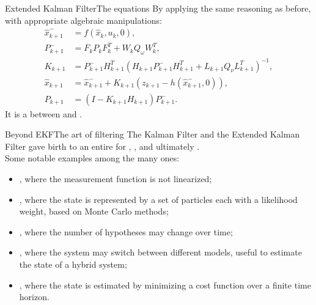 \begin{frame}{Extended Kalman Filter}{The equations}
  By applying the same reasoning as before, with appropriate algebraic manipulations:
  \begin{subequations}
    \begin{align}
      \hat{x}_{k+1}^{-} &= f(\hat{x}_k,u_k,0),\\
      P_{k+1}^{-} &= F_kP_kF_k^T + W_kQ_{\omega}W_k^T,\\
      K_{k+1} &= P_{k+1}^{-}H_{k+1}^T(H_{k+1}P_{k+1}^{-}H_{k+1}^T + L_{k+1}Q_{\nu}L_{k+1}^T)^{-1},\\
      \hat{x}_{k+1} &= \hat{x}_{k+1}^{-} + K_{k+1}(z_{k+1} - h(\hat{x}_{k+1}^{-},0)),\\
      P_{k+1} &= (I - K_{k+1}H_{k+1})P_{k+1}^{-}.
    \end{align}
  \end{subequations}
  It is a  between  and .
\end{frame}

\begin{frame}{Beyond EKF}{The art of filtering}
  The Kalman Filter and the Extended Kalman Filter gave birth to an entire  for , , and ultimately .\\
  Some notable examples among the many ones:
  \begin{itemize}
    \item<1-> , where the measurement function is not linearized;
    \item<2-> , where the state is represented by a set of particles each with a likelihood weight, based on Monte Carlo methods;
    \item<3-> , where the number of hypotheses may change over time;
    \item<4-> , where the system may switch between different models, useful to estimate the state of a hybrid system;
    \item<5-> , where the state is estimated by minimizing a cost function over a finite time horizon.
  \end{itemize}
\end{frame}

